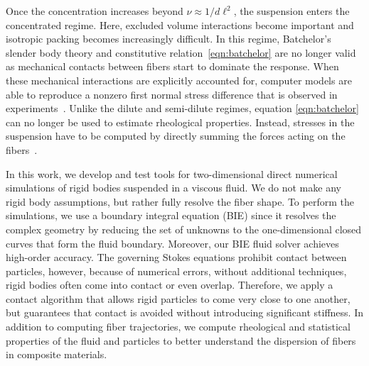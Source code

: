 \documentclass[AMA,STIX1COL]{WileyNJD-v2}
\begin{document}
Once the concentration increases beyond $\nu \approx 1/d\ell^2$, the
suspension enters the concentrated regime. Here, excluded volume
interactions become important and isotropic packing becomes increasingly
difficult. In this regime, Batchelor's slender body theory and
constitutive relation~\eqref{eqn:batchelor} are no longer valid as
mechanical contacts between fibers start to dominate the response. When
these mechanical interactions are explicitly accounted for, computer
models are able to reproduce a nonzero first normal stress difference
that is observed in experiments~\cite{Sundararajakumar1997, Ausias2006,
Lindstroem2008}. Unlike the dilute and semi-dilute regimes, equation
\eqref{eqn:batchelor} can no longer be used to estimate rheological
properties. Instead, stresses in the suspension have to be computed by
directly summing the forces acting on the fibers~\cite{Ausias2006,
Lindstroem2008}.

In this work, we develop and test tools for two-dimensional direct
numerical simulations of rigid bodies suspended in a viscous fluid.  We
do not make any rigid body assumptions, but rather fully resolve the
fiber shape.  To perform the simulations, we use a boundary integral
equation (BIE) since it resolves the complex geometry by reducing the
set of unknowns to the one-dimensional closed curves that form the fluid
boundary.  Moreover, our BIE fluid solver achieves high-order accuracy.
The governing Stokes equations prohibit contact between particles,
however, because of numerical errors, without additional techniques,
rigid bodies often come into contact or even overlap. Therefore, we
apply a contact algorithm that allows rigid particles to come very close
to one another, but guarantees that contact is avoided without
introducing significant stiffness.  In addition to computing fiber
trajectories, we compute rheological and statistical properties of the
fluid and particles to better understand the dispersion of fibers in
composite materials.
\end{document}
